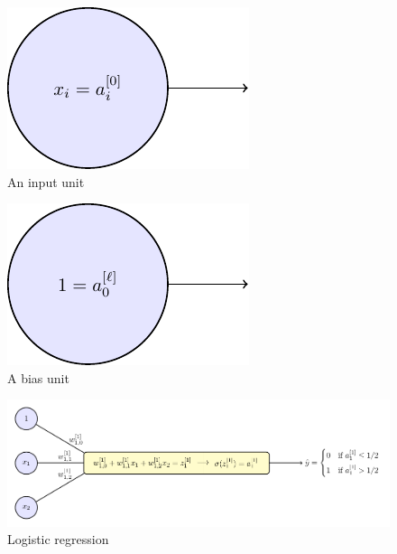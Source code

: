 \documentclass{beamer}
\begin{document}
\begin{frame}{}
    \begin{figure}
        \includegraphics[scale=0.9]{./input/input.pdf}
        \caption{An input unit}
        \end{figure}
    \begin{figure}
    \includegraphics[scale=0.9]{./bias/bias.pdf}
    \caption{A bias unit}
    \end{figure}
\end{frame}

\begin{frame}{}
    \begin{figure}
        \includegraphics[scale=0.69]{./logistic_regression/logistic_regression.pdf}
        \caption{Logistic regression}
    \end{figure}
\end{frame}
\end{document}
